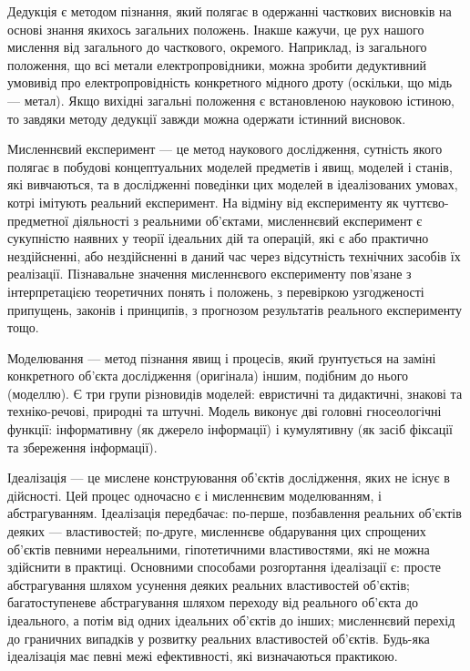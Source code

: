 Дедукція є методом пізнання, який полягає в одержанні часткових
висновків на основі знання якихось загальних положень. Інакше кажучи, це рух
нашого мислення від загального до часткового, окремого. Наприклад, із
загального положення, що всі метали електропровідники, можна зробити
дедуктивний умовивід про електропровідність конкретного мідного дроту
(оскільки, що мідь --- метал). Якщо вихідні загальні положення є встановленою
науковою істиною, то завдяки методу дедукції завжди можна одержати
істинний висновок.

Мисленнєвий експеримент --- це метод наукового дослідження, сутність
якого полягає в побудові концептуальних моделей предметів і явищ, моделей і
станів, які вивчаються, та в дослідженні поведінки цих моделей в ідеалізованих
умовах, котрі імітують реальний експеримент. На відміну від експерименту як
чуттєво-предметної діяльності з реальними об’єктами, мисленнєвий
експеримент є сукупністю наявних у теорії ідеальних дій та операцій, які є або
практично нездійсненні, або нездійсненні в даний час через відсутність
технічних засобів їх реалізації. Пізнавальне значення мисленнєвого
експерименту пов’язане з інтерпретацією теоретичних понять і положень, з
перевіркою узгодженості припущень, законів і принципів, з прогнозом
результатів реального експерименту тощо.

Моделювання --- метод пізнання явищ і процесів, який ґрунтується на заміні
конкретного об’єкта дослідження (оригінала) іншим, подібним до нього
(моделлю). Є три групи різновидів моделей: евристичні та дидактичні, знакові
та техніко-речові, природні та штучні. Модель виконує дві головні
гносеологічні функції: інформативну (як джерело інформації) і кумулятивну (як
засіб фіксації та збереження інформації).

Ідеалізація --- це мислене конструювання об’єктів дослідження, яких не існує
в дійсності. Цей процес одночасно є і мисленнєвим моделюванням, і
абстрагуванням. Ідеалізація передбачає: по-перше, позбавлення реальних
об’єктів деяких --- властивостей; по-друге, мисленнєве обдарування цих
спрощених об’єктів певними нереальними, гіпотетичними властивостями, які
не можна здійснити в практиці. Основними способами розгортання ідеалізації
є: просте абстрагування шляхом усунення деяких реальних властивостей
об’єктів; багатоступеневе абстрагування шляхом переходу від реального
об’єкта до ідеального, а потім від одних ідеальних об’єктів до інших;
мисленнєвий перехід до граничних випадків у розвитку реальних властивостей
об’єктів. Будь-яка ідеалізація має певні межі ефективності, які визначаються
практикою.

